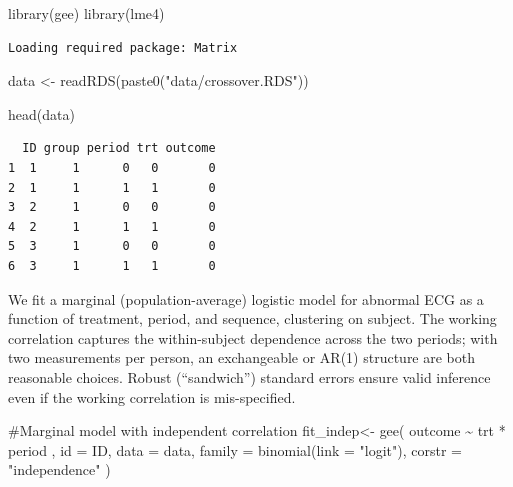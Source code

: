 \documentclass[
  letterpaper,
  DIV=11,
  numbers=noendperiod]{scrreprt}
\newenvironment{Shaded}{\begin{snugshade}}{\end{snugshade}}
\newcommand{\AttributeTok}[1]{\textcolor[rgb]{0.40,0.45,0.13}{#1}}
\newcommand{\CommentTok}[1]{\textcolor[rgb]{0.37,0.37,0.37}{#1}}
\newcommand{\FunctionTok}[1]{\textcolor[rgb]{0.28,0.35,0.67}{#1}}
\newcommand{\NormalTok}[1]{\textcolor[rgb]{0.00,0.23,0.31}{#1}}
\newcommand{\OtherTok}[1]{\textcolor[rgb]{0.00,0.23,0.31}{#1}}
\newcommand{\SpecialCharTok}[1]{\textcolor[rgb]{0.37,0.37,0.37}{#1}}
\newcommand{\StringTok}[1]{\textcolor[rgb]{0.13,0.47,0.30}{#1}}
\begin{document}
\begin{Shaded}
\begin{Highlighting}[]
\FunctionTok{library}\NormalTok{(gee)}
\FunctionTok{library}\NormalTok{(lme4)}
\end{Highlighting}
\end{Shaded}

\begin{verbatim}
Loading required package: Matrix
\end{verbatim}

\begin{Shaded}
\begin{Highlighting}[]
\NormalTok{data }\OtherTok{\textless{}{-}} \FunctionTok{readRDS}\NormalTok{(}\FunctionTok{paste0}\NormalTok{(}\StringTok{"data/crossover.RDS"}\NormalTok{))}

\FunctionTok{head}\NormalTok{(data)}
\end{Highlighting}
\end{Shaded}

\begin{verbatim}
  ID group period trt outcome
1  1     1      0   0       0
2  1     1      1   1       0
3  2     1      0   0       0
4  2     1      1   1       0
5  3     1      0   0       0
6  3     1      1   1       0
\end{verbatim}

We fit a marginal (population-average) logistic model for abnormal ECG
as a function of treatment, period, and sequence, clustering on subject.
The working correlation captures the within-subject dependence across
the two periods; with two measurements per person, an exchangeable or
AR(1) structure are both reasonable choices. Robust (``sandwich'')
standard errors ensure valid inference even if the working correlation
is mis-specified.

\begin{Shaded}
\begin{Highlighting}[]
\CommentTok{\#Marginal model with independent correlation}
\NormalTok{fit\_indep}\OtherTok{\textless{}{-}} \FunctionTok{gee}\NormalTok{(}
\NormalTok{  outcome }\SpecialCharTok{\textasciitilde{}}\NormalTok{ trt }\SpecialCharTok{*}\NormalTok{ period ,}
  \AttributeTok{id =}\NormalTok{ ID, }\AttributeTok{data =}\NormalTok{ data,}
  \AttributeTok{family =} \FunctionTok{binomial}\NormalTok{(}\AttributeTok{link =} \StringTok{"logit"}\NormalTok{),}
  \AttributeTok{corstr =} \StringTok{"independence"}
\NormalTok{)}
\end{Highlighting}
\end{Shaded}
\end{document}
